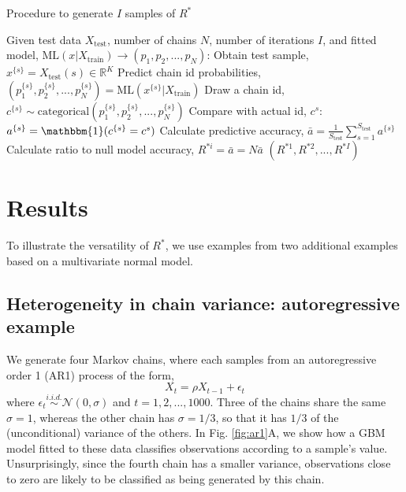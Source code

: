 \documentclass{article}
\begin{document}
\begin{algorithm}[tb]
	\caption{Procedure to generate $I$ samples of $R^*$}
	\label{alg:R_star_uncertainty}
	\begin{algorithmic}
		\STATE Given test data $X_\text{test}$, number of chains $N$, number of iterations $I$, and fitted
		\STATE model, $\text{ML}(x|X_\text{train})\rightarrow(p_1,p_2,...,p_N)$:
		\STATE Obtain test sample, $x^{\{s\}}=X_\text{test}(s)\in \mathbb{R}^K$
		\STATE Predict chain id probabilities, $(p_1^{\{s\}},p_2^{\{s\}},...,p_N^{\{s\}})= \text{ML}(x^{\{s\}}|X_\text{train})$
		\STATE Draw a chain id, $c^{\{s\}} \sim \text{categorical}(p_1^{\{s\}},p_2^{\{s\}},...,p_N^{\{s\}})$
		\STATE Compare with actual id, $c^s$: $a^{\{s\}}=\mathbbm{1}(c^{\{s\}}=c^s)$
		\ENDFOR
		\STATE Calculate predictive accuracy, $\bar{a} = \frac{1}{S_\text{test}} \sum_{s=1}^{S_\text{test}} a^{\{s\}}$
		\STATE Calculate ratio to null model accuracy, $R^{*i} = \bar{a} = N\bar{a}$
		\ENDFOR
		\RETURN $(R^{*1},R^{*2},...,R^{*I})$
	\end{algorithmic}
\end{algorithm}

\section{Results}\label{sec:results}
To illustrate the versatility of $R^*$, we use examples from \cite{vehtari2019rank} two additional examples based on a multivariate normal model.

\subsection{Heterogeneity in chain variance: autoregressive example}\label{sec:heterogeneity}
We generate four Markov chains, where each samples from an autoregressive order 1 (AR1) process of the form,
%
\begin{equation}
X_t = \rho X_{t-1} + \epsilon_t
\end{equation}
%
where $\epsilon_t\stackrel{i.i.d.}{\sim}\mathcal{N}(0, \sigma)$ and $t=1,2,...,1000$. Three of the chains share the same $\sigma=1$, whereas the other chain has $\sigma=1/3$, so that it has $1/3$ of the (unconditional) variance of the others. In Fig. \ref{fig:ar1}A, we show how a GBM model fitted to these data classifies observations according to a sample's value. Unsurprisingly, since the fourth chain has a smaller variance, observations close to zero are likely to be classified as being generated by this chain.
\end{document}
